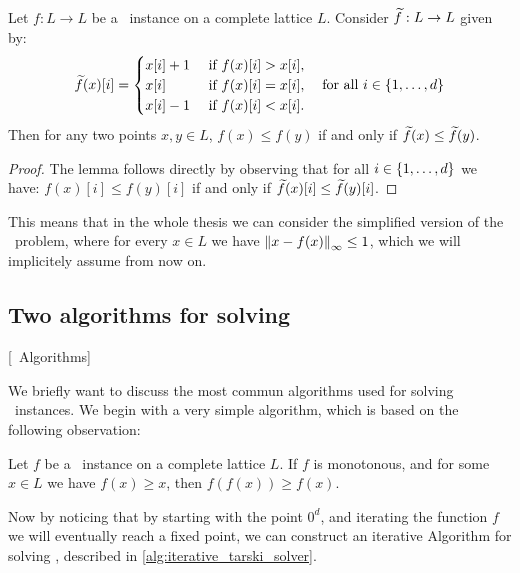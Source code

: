 \begin{lemma}
    Let $f : L \rightarrow L$ be a \Tarski\ instance on a complete lattice $L$. Consider $\widetilde{f} : L \rightarrow L$ given by: 
    \begin{align*}
        \widetilde{f}(x)[i] = \begin{cases}
                            x[i] + 1 & \text{ if } f(x)[i] > x[i], \\
                            x[i]     & \text{ if } f(x)[i] = x[i], \\
                            x[i] - 1 & \text{ if } f(x)[i] < x[i].
                        \end{cases} \quad \text{for all $i \in \left\{1, \dots, d\right\}$}
    \end{align*}
    Then for any two points $x, y \in L$, $f(x) \leq f(y)$ if and only if $\widetilde{f}(x) \leq \widetilde{f}(y)$.
\end{lemma}
\begin{proof}
    The lemma follows directly by observing that for all $i \in \left\{1, \dots, d\right\}$ we have: $f(x)[i] \leq f(y)[i]$ if and only if $\widetilde{f}(x)[i] \leq \widetilde{f}(y)[i]$.
\end{proof}
This means that in the whole thesis we can consider the simplified version of the \Tarski\ problem, where for every $x \in L$ we have $\left\lVert x - f(x)\right\rVert_{\infty} \leq 1$, which we will implicitely assume from now on.

\subsection{Two algorithms for solving \Tarski}[\Tarski\ Algorithms]

We briefly want to discuss the most commun algorithms used for solving \Tarski\ instances. We begin with a very simple algorithm, which is based on the following observation:
\begin{remark}
    Let $f$ be a \Tarski\ instance on a complete lattice $L$. If $f$ is monotonous, and for some $x \in L$ we have $f(x) \geq x$, then $f(f(x)) \geq f(x)$.
\end{remark}
Now by noticing that by starting with the point $0^d$, and iterating the function $f$ we will eventually reach a fixed point, we can construct an iterative Algorithm for solving \Tarski, described in \cref{alg:iterative_tarski_solver}.

